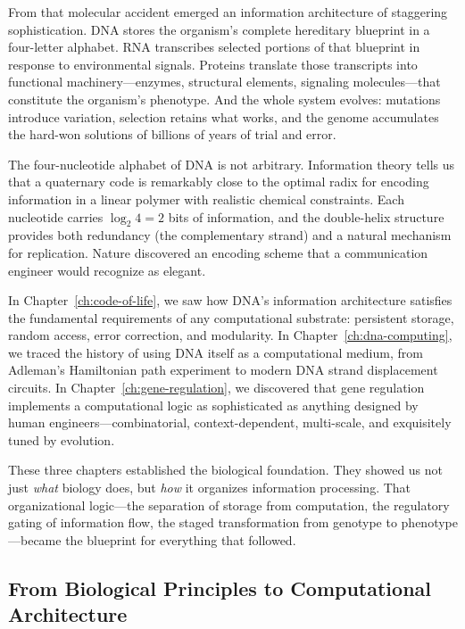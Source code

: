 From that molecular accident emerged an information architecture of staggering sophistication. DNA stores the organism's complete hereditary blueprint in a four-letter alphabet. RNA transcribes selected portions of that blueprint in response to environmental signals. Proteins translate those transcripts into functional machinery---enzymes, structural elements, signaling molecules---that constitute the organism's phenotype. And the whole system evolves: mutations introduce variation, selection retains what works, and the genome accumulates the hard-won solutions of billions of years of trial and error.

\begin{bioinsight}
The four-nucleotide alphabet of DNA is not arbitrary. Information theory tells us that a quaternary code is remarkably close to the optimal radix for encoding information in a linear polymer with realistic chemical constraints. Each nucleotide carries $\log_2 4 = 2$ bits of information, and the double-helix structure provides both redundancy (the complementary strand) and a natural mechanism for replication. Nature discovered an encoding scheme that a communication engineer would recognize as elegant.
\end{bioinsight}

In Chapter~\ref{ch:code-of-life}, we saw how DNA's information architecture satisfies the fundamental requirements of any computational substrate: persistent storage, random access, error correction, and modularity. In Chapter~\ref{ch:dna-computing}, we traced the history of using DNA itself as a computational medium, from Adleman's Hamiltonian path experiment to modern DNA strand displacement circuits. In Chapter~\ref{ch:gene-regulation}, we discovered that gene regulation implements a computational logic as sophisticated as anything designed by human engineers---combinatorial, context-dependent, multi-scale, and exquisitely tuned by evolution.

These three chapters established the biological foundation. They showed us not just \emph{what} biology does, but \emph{how} it organizes information processing. That organizational logic---the separation of storage from computation, the regulatory gating of information flow, the staged transformation from genotype to phenotype---became the blueprint for everything that followed.

\subsection{From Biological Principles to Computational Architecture}

